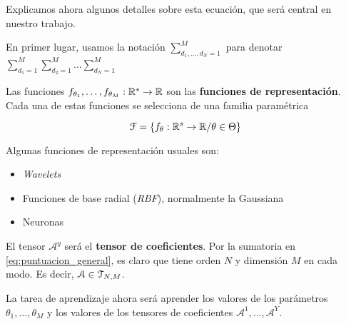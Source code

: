 Explicamos ahora algunos detalles sobre esta ecuación, que será central en nuestro trabajo.

En primer lugar, usamos la notación $\sum_{d_1, \ldots, d_N = 1}^{M}$ para denotar $\sum_{d_1 = 1}^{M} \sum_{d_2 = 1}^{M} \ldots \sum_{d_N = 1}^{M}$

Las funciones $f_{\theta_1}, \ldots, f_{\theta_M}: \mathbb{R}^s \to \mathbb{R}$ son las \textbf{funciones de representación}. Cada una de estas funciones se selecciona de una familia paramétrica

$$\mathcal{F} = \{ f_{\theta}: \mathbb{R}^s \to \mathbb{R} / \theta \in \Theta \}$$

Algunas funciones de representación usuales son:

\begin{itemize}
    \item \textit{Wavelets}
    \item Funciones de base radial (\textit{RBF}), normalmente la Gaussiana
    \item Neuronas
\end{itemize}

El tensor $\mathcal{A}^y$ será el \textbf{tensor de coeficientes}. Por la sumatoria en \eqref{eq:puntuacion_general}, es claro que tiene orden $N$ y dimensión $M$ en cada modo. Es decir, $\mathcal{A} \in \mathcal{T}_{N, M}$.

La tarea de aprendizaje ahora será aprender los valores de los parámetros $\theta_1, \ldots, \theta_M$ y los valores de los tensores de coeficientes $\mathcal{A}^1, \ldots, \mathcal{A}^Y$.

